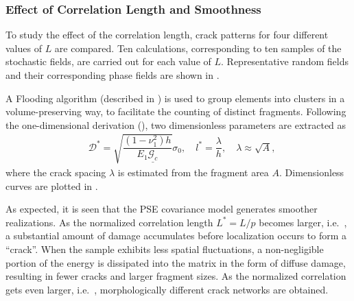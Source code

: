 \subsubsection{Effect of Correlation Length and Smoothness}

To study the effect of the correlation length, crack patterns for four different values of $L$ are compared. Ten calculations, corresponding to ten samples of the stochastic fields, are carried out for each value of $L$. Representative random fields and their corresponding phase fields are shown in .





A Flooding algorithm (described in ) is used to group elements into clusters in a volume-preserving way, to facilitate the counting of distinct fragments. Following the one-dimensional derivation (), two dimensionless parameters are extracted as
\begin{align}
   & \mathcal{D}^* = \sqrt{\dfrac{(1-\nu_1^2)h}{E_1\underline{\mathcal{G}_c}}}\sigma_0, \quad l^* = \dfrac{\lambda}{h}, \quad \lambda \approx \sqrt{A} , 
\end{align}
where the crack spacing $\lambda$ is estimated from the fragment area $A$. Dimensionless curves are plotted in .

As expected, it is seen that the PSE covariance model generates smoother realizations. As the normalized correlation length $L^* = L/p$ becomes larger, i.e.\ ,
a substantial amount of damage accumulates before localization occurs to form a ``crack''. When the sample exhibits less spatial fluctuations, a non-negligible portion of the energy is dissipated into the matrix in the form of diffuse damage, resulting in fewer cracks and larger fragment sizes. As the normalized correlation gets even larger, i.e.\ , morphologically different crack networks are obtained.

